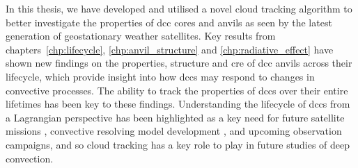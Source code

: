 In this thesis, we have developed and utilised a novel cloud tracking algorithm to better investigate the properties of \acrshort{dcc} cores and anvils as seen by the latest generation of geostationary weather satellites.
Key results from chapters~\ref{chp:lifecycle}, \ref{chp:anvil_structure} and \ref{chp:radiative_effect} have shown new findings on the properties, structure and \acrshort{cre} of \acrshort{dcc} anvils across their lifecycle, which provide insight into how \acrshort{dcc}s may respond to changes in convective processes.
The ability to track the properties of \acrshort{dcc}s over their entire lifetimes has been key to these findings.
Understanding the lifecycle of \acrshort{dcc}s from a Lagrangian perspective has been highlighted as a key need for future satellite missions \citep{vandenheever_tropical_2023}, convective resolving model development \citep{prein_kmscale_2024}, and upcoming observation campaigns, and so cloud tracking has a key role to play in future studies of deep convection.
